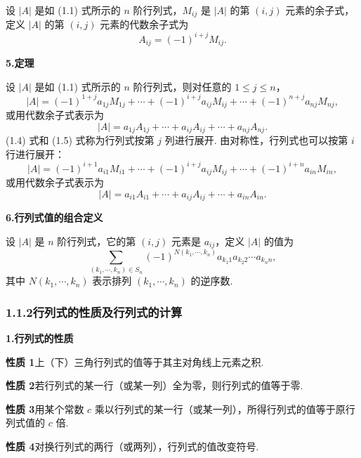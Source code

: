 \documentclass[UTF8, 12pt, fontset=fandol, oneside]{ctexart}
\begin{document}
设 $|A|$ 是如 (1.1) 式所示的 $n$ 阶行列式，$M_{ij}$ 是 $|A|$ 的第 $(i,j)$ 元素的余子式，定义 $|A|$ 的第 $(i,j)$ 元素的代数余子式为
\begin{equation}
A_{ij}=(-1)^{i+j}M_{ij}.
\tag{1.3}
\end{equation}

\noindent\textbf{5.\quad 定理}

设 $|A|$ 是如 (1.1) 式所示的 $n$ 阶行列式，则对任意的 $1\le j\le n$，
\begin{equation}
|A|=(-1)^{1+j}a_{1j}M_{1j}+\cdots+(-1)^{i+j}a_{ij}M_{ij}
+\cdots+(-1)^{n+j}a_{nj}M_{nj},
\tag{1.4}
\end{equation}
或用代数余子式表示为
\begin{equation}
|A|=a_{1j}A_{1j}+\cdots+a_{ij}A_{ij}+\cdots+a_{nj}A_{nj}.
\tag{1.5}
\end{equation}
(1.4) 式和 (1.5) 式称为行列式按第 $j$ 列进行展开. 由对称性，行列式也可以按第 $i$ 行进行展开：
\begin{equation}
|A|=(-1)^{i+1}a_{i1}M_{i1}+\cdots+(-1)^{i+j}a_{ij}M_{ij}
+\cdots+(-1)^{i+n}a_{in}M_{in},
\tag{1.6}
\end{equation}
或用代数余子式表示为
\begin{equation}
|A|=a_{i1}A_{i1}+\cdots+a_{ij}A_{ij}+\cdots+a_{in}A_{in}.
\tag{1.7}
\end{equation}

\noindent\textbf{6.\quad 行列式值的组合定义}

设 $|A|$ 是 $n$ 阶行列式，它的第 $(i,j)$ 元素是 $a_{ij}$，定义 $|A|$ 的值为
\[
\sum_{(k_1,\cdots,k_n)\in S_n}(-1)^{N(k_1,\cdots,k_n)}
a_{k_1 1}a_{k_2 2}\cdots a_{k_n n},
\]
其中 $N(k_1,\cdots,k_n)$ 表示排列 $(k_1,\cdots,k_n)$ 的逆序数.

\subsubsection*{1.1.2\quad 行列式的性质及行列式的计算}

\noindent\textbf{1.\quad 行列式的性质}

\noindent\textbf{性质 1}\quad 上（下）三角行列式的值等于其主对角线上元素之积.

\noindent\textbf{性质 2}\quad 若行列式的某一行（或某一列）全为零，则行列式的值等于零.

\noindent\textbf{性质 3}\quad 用某个常数 $c$ 乘以行列式的某一行（或某一列），所得行列式的值等于原行列式值的 $c$ 倍.

\noindent\textbf{性质 4}\quad 对换行列式的两行（或两列），行列式的值改变符号.
\end{document}

